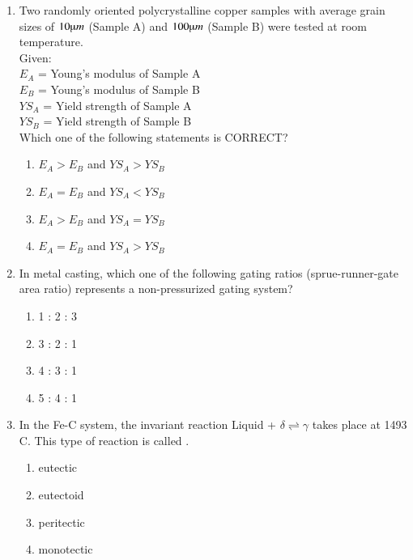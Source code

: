 \documentclass[journal]{IEEEtran}
\theoremstyle{remark}
\begin{document}
\begin{enumerate}[resume]
\item Two randomly oriented polycrystalline copper samples with average grain sizes of $10 \micro m$ (Sample A) and $100 \micro m$ (Sample B) were tested at room temperature. \hfill{} \\
Given: \\
$E_A$ = Young’s modulus of Sample A \\
$E_B$ = Young’s modulus of Sample B \\
$YS_A$ = Yield strength of Sample A \\
$YS_B$ = Yield strength of Sample B \\
Which one of the following statements is CORRECT?
\begin{enumerate}
\item $E_A > E_B$ and $YS_A > YS_B$
\item $E_A = E_B$ and $YS_A < YS_B$
\item $E_A > E_B$ and $YS_A = YS_B$
\item $E_A = E_B$ and $YS_A > YS_B$
\end{enumerate}

\item In metal casting, which one of the following gating ratios (sprue-runner-gate area ratio) represents a non-pressurized gating system? \hfill{}
\begin{multicols}{4}
\begin{enumerate}
\item 1 : 2 : 3
\item 3 : 2 : 1
\item 4 : 3 : 1
\item 5 : 4 : 1
\end{enumerate}
\end{multicols}

\item In the Fe-C system, the invariant reaction Liquid + $\delta \rightleftharpoons \gamma$ takes place at 1493 \degree C. This type of reaction is called \underline{\hspace{2cm}}. \hfill{}
\begin{multicols}{4}
\begin{enumerate}
\item eutectic
\item eutectoid
\item peritectic
\item monotectic
\end{enumerate}
\end{multicols}


\end{enumerate}
\end{document}
